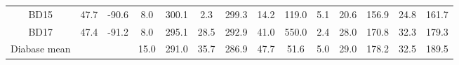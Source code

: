 \documentclass[draft]{agujournal2019}
\begin{document}
\begin{table}
\begin{tabular}{cccccccccccccc}
BD15             & 47.7 & -90.6 & 8.0  & 300.1   & 2.3          & 299.3   & 14.2    & 119.0 & 5.1                     & 20.6        & 156.9       & 24.8         & 161.7        \\
BD17             & 47.4 & -91.2 & 8.0  & 295.1   & 28.5         & 292.9   & 41.0    & 550.0 & 2.4                     & 28.0        & 170.8       & 32.3         & 179.3        \\
\hline
Diabase mean     &      &       & 15.0 & 291.0   & 35.7         & 286.9   & 47.7    & 51.6  & 5.0                     & 29.0        & 178.2       & 32.5         & 189.5       \\
\hline
\end{tabular}
\label{tab:Pmag_site_data}
\end{table}

\clearpage
\def\url#1{}

\end{document}
